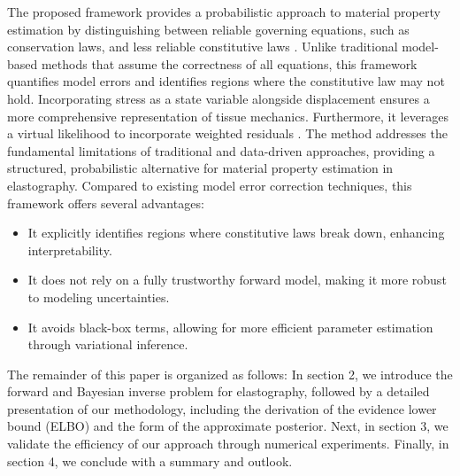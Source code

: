 The proposed framework provides a probabilistic approach to material property estimation by distinguishing between reliable governing equations, such as conservation laws, and less reliable constitutive laws \cite{koutsourelakis2012novel, bruder2018beyond}. Unlike traditional model-based methods that assume the correctness of all equations, this framework quantifies model errors and identifies regions where the constitutive law may not hold. Incorporating stress as a state variable alongside displacement ensures a more comprehensive representation of tissue mechanics. Furthermore, it leverages a virtual likelihood \cite{kaltenbach2020incorporating} to incorporate weighted residuals \cite{scholz2025weak}. The method addresses the fundamental limitations of traditional and data-driven approaches, providing a structured, probabilistic alternative for material property estimation in elastography. Compared to existing model error correction techniques, this framework offers several advantages:
\begin{itemize}
    \item It explicitly identifies regions where constitutive laws break down, enhancing interpretability.
    \item It does not rely on a fully trustworthy forward model, making it more robust to modeling uncertainties.
    \item It avoids black-box terms, allowing for more efficient parameter estimation through variational inference.
\end{itemize}

The remainder of this paper is organized as follows: In section 2, we introduce the forward and Bayesian inverse problem for elastography, followed by a detailed presentation of our methodology, including the derivation of the evidence lower bound (ELBO) and the form of the approximate posterior. Next, in section 3, we validate the efficiency of our approach through numerical experiments. Finally, in section 4, we conclude with a summary and outlook.
